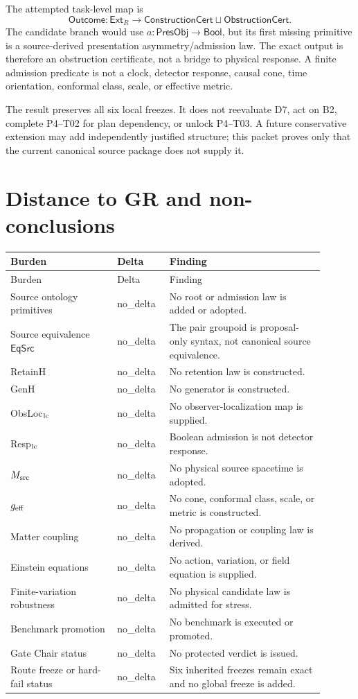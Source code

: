 \documentclass[11pt]{article}
\newcommand{\PresObj}{\mathsf{PresObj}}
\newcommand{\Bool}{\mathsf{Bool}}
\newcommand{\Ext}{\mathsf{Ext}_{R}}
\newcommand{\EqSrc}{\mathsf{EqSrc}}
\newcommand{\status}[1]{\textsf{#1}}
\begin{document}
The attempted task-level map is
\[
 \mathsf{Outcome}:\Ext\longrightarrow
 \mathsf{ConstructionCert}\sqcup\mathsf{ObstructionCert}.
\]
The candidate branch would use $a:\PresObj\to\Bool$, but its first missing
primitive is a source-derived presentation asymmetry/admission law.  The exact
output is therefore an obstruction certificate, not a bridge to physical
response.  A finite admission predicate is not a clock, detector response,
causal cone, time orientation, conformal class, scale, or effective metric.

The result preserves all six local freezes.  It does not reevaluate D7, act on
B2, complete P4--T02 for plan dependency, or unlock P4--T03.  A future
conservative extension may add independently justified structure; this packet
proves only that the current canonical source package does not supply it.

\section{Distance to GR and non-conclusions}

\begin{longtable}{P{0.31\linewidth}P{0.14\linewidth}P{0.45\linewidth}}
\toprule
Burden & Delta & Finding \\
\midrule
\endfirsthead
\toprule
Burden & Delta & Finding \\
\midrule
\endhead
Source ontology primitives & \status{no\_delta} & No root or admission law is added or adopted. \\
Source equivalence $\EqSrc$ & \status{no\_delta} & The pair groupoid is proposal-only syntax, not canonical source equivalence. \\
RetainH & \status{no\_delta} & No retention law is constructed. \\
GenH & \status{no\_delta} & No generator is constructed. \\
ObsLoc$_{\rm lc}$ & \status{no\_delta} & No observer-localization map is supplied. \\
Resp$_{\rm lc}$ & \status{no\_delta} & Boolean admission is not detector response. \\
$M_{\rm src}$ & \status{no\_delta} & No physical source spacetime is adopted. \\
$g_{\rm eff}$ & \status{no\_delta} & No cone, conformal class, scale, or metric is constructed. \\
Matter coupling & \status{no\_delta} & No propagation or coupling law is derived. \\
Einstein equations & \status{no\_delta} & No action, variation, or field equation is supplied. \\
Finite-variation robustness & \status{no\_delta} & No physical candidate law is admitted for stress. \\
Benchmark promotion & \status{no\_delta} & No benchmark is executed or promoted. \\
Gate Chair status & \status{no\_delta} & No protected verdict is issued. \\
Route freeze or hard-fail status & \status{no\_delta} & Six inherited freezes remain exact and no global freeze is added. \\
\bottomrule
\end{longtable}
\end{document}
